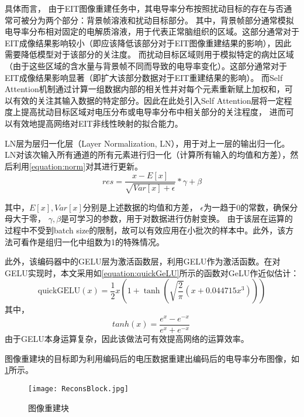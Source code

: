 具体而言， 由于EIT图像重建任务中，其电导率分布按照扰动目标的存在与否通常可被分为两个部分：背景帧溶液和扰动目标部分。
其中，背景帧部分通常模拟电导率分布相对固定的电解质溶液，用于代表正常脑组织的区域。这部分通常对于EIT成像结果影响较小（即应该降低该部分对于EIT图像重建结果的影响），因此需要降低模型对于该部分的关注度。
而扰动目标区域则用于模拟特定的病灶区域（由于这些区域的含水量与背景帧不同而导致的电导率变化）。这部分通常对于EIT成像结果影响显著（即扩大该部分数据对于EIT重建结果的影响）。
而Self Attention机制通过计算一组数据内部的相关性并对每个元素重新赋上加权和，可以有效的关注其输入数据的特定部分。因此在此处引入Self Attention层将一定程度上提高扰动目标区域对电压分布或电导率分布中相关部分的关注程度，
进而可以有效地提高网络对EIT非线性映射的拟合能力。

LN层为层归一化层（Layer Normalization, LN），用于对上一层的输出归一化。
LN对该次输入所有通道的所有元素进行归一化（计算所有输入的均值和方差），然后利用\cref{equation:norm}对其进行更新。
\begin{equation}
  \label{equation:norm}
  res = \frac{x - E\left[ x\right]}{\sqrt{Var\left[ x\right] + \epsilon}} * \gamma + \beta
\end{equation}

其中，$E\left[ x\right], Var\left[ x\right]$分别是上述数据的均值和方差， $\epsilon$为一趋于0的常数，确保分母大于零，
$\gamma, \beta$是可学习的参数，用于对数据进行仿射变换。
由于该层在运算的过程中不受到batch size的限制，故可以有效应用在小批次的样本中。此外，该方法可看作是组归一化中组数为1的特殊情况。


此外，该编码器中的GELU层为激活函数层，利用GELU作为激活函数。在对GELU实现时，本文采用如\cref{equation:quickGeLU}所示的函数对GeLU作近似估计：
  \begin{equation}
    \label{equation:quickGeLU}
    \text{quickGELU}(x) = \frac{1}{2}x\left(1 + \tanh\left(\sqrt{\frac{2}{\pi}}\left(x + 0.044715x^3\right)\right)\right)
  \end{equation}
  其中，
  \begin{equation}
    tanh(x) = \frac{{e^{x} - e^{-x}}}{{e^{x} + e^{-x}}}
\
  \end{equation}
由于GELU本身运算复杂，因此该做法可有效提高网络的运算效率。



图像重建块的目标即为利用编码后的电压数据重建出编码后的电导率分布图像，如\cref{figure:ReconsBlock}所示。
\begin{figure}[h]
    \centering
    \texttt{[image: ReconsBlock.jpg]}
    \caption{图像重建块}
    \label{figure:ReconsBlock}
\end{figure}

